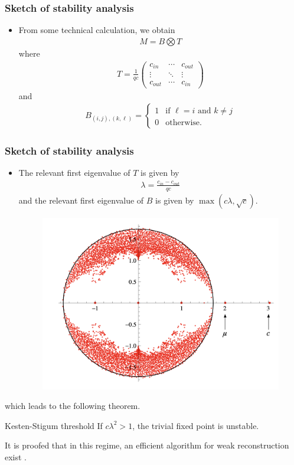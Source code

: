 \documentclass[dvipdfmx,11pt]{beamer}
\begin{document}
\begin{frame}
  \frametitle{Sketch of stability analysis}
  \begin{itemize}
    \frametitle{Sketch of stability analysis}
    \item From some technical calculation, we obtain
    \begin{align*}
      M = B \bigotimes T
    \end{align*}
    where 
    \begin{align*}
      T = \frac{1}{qc}
        \begin{pmatrix}
        c_{in} & \cdots & c_{out} \\
        \vdots & \ddots & \vdots \\
        c_{out} & \cdots & c_{in}
        \end{pmatrix}
    \end{align*}
    and 
    \begin{align*}
      B_{(i,j),(k,\ell)} = 
        \begin{cases} 
        1 & \text{if } \ell = i \text{ and } k \neq j \\
        0 & \text{otherwise}.
        \end{cases}
    \end{align*}
  \end{itemize}
  

\end{frame}

\begin{frame}
  \frametitle{Sketch of stability analysis}
  \begin{itemize}
    \item The relevant first eigenvalue of $T$ is given by 
    \begin{align*}
      \lambda = \frac{c_{in} - c_{out}}{qc}
    \end{align*}
    and the relevant first eigenvalue of $B$ is given by $\max(c\lambda, \sqrt{c})$.
    \begin{figure}
      \centering
      \includegraphics[width=0.3\linewidth]{figure/eign.png}
    \end{figure}
  \end{itemize}
  which leads to the following theorem.


\begin{block}{Kesten-Stigum threshold}
  If $c\lambda^2 > 1$, the trivial fixed point is unstable.
\end{block}
It is proofed that in this regime, an efficient algorithm for weak reconstruction exist \Smiley.
  

\end{frame}
\end{document}

